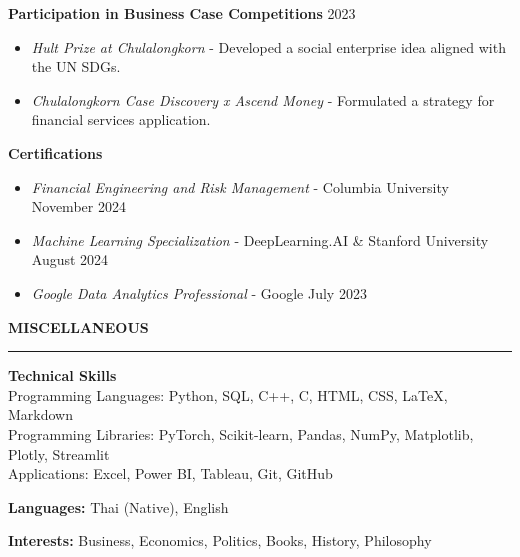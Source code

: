\documentclass[a4paper,11pt]{article}
\begin{document}
\textbf{Participation in Business Case Competitions} \hfill 2023
\begin{itemize}[noitemsep, topsep=0pt, partopsep=0pt, parsep=0pt]
    \item \textit{Hult Prize at Chulalongkorn} - Developed a social enterprise idea aligned with the UN SDGs.
    \item \textit{Chulalongkorn Case Discovery x Ascend Money} - Formulated a strategy for financial services application.
\end{itemize}

\vspace{3pt}

\textbf{Certifications}
\begin{itemize}[noitemsep, topsep=0pt, partopsep=0pt, parsep=0pt]
    \item \textit{Financial Engineering and Risk Management} - Columbia University \hfill November 2024
    \item \textit{Machine Learning Specialization} - DeepLearning.AI \& Stanford University \hfill August 2024
    \item \textit{Google Data Analytics Professional} - Google \hfill July 2023
\end{itemize}





\vspace{6pt}
\textbf{MISCELLANEOUS}
\vspace{5pt}
{\color{NavyBlue}\hrule}
\vspace{6pt}

\textbf{Technical Skills}\\
\hspace*{7pt} Programming Languages: Python, SQL, C++, C, HTML, CSS, LaTeX, Markdown\\
\hspace*{7pt} Programming Libraries: PyTorch, Scikit-learn, Pandas, NumPy, Matplotlib, Plotly, Streamlit\\
\hspace*{7pt} Applications: Excel, Power BI, Tableau, Git, GitHub

\textbf{Languages:} Thai (Native), English

\textbf{Interests:} Business, Economics, Politics, Books, History, Philosophy
\end{document}
